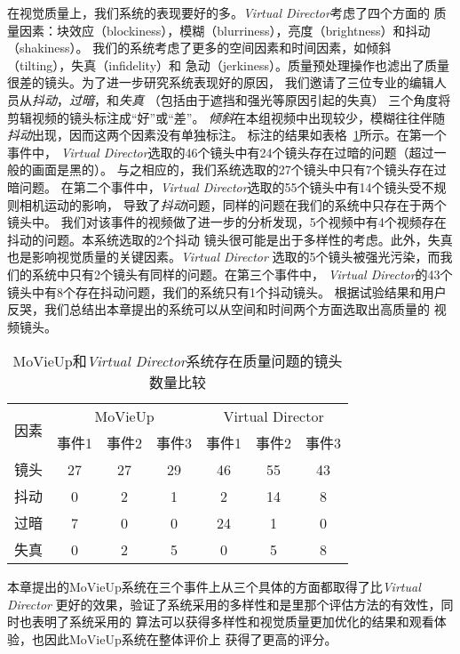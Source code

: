 在视觉质量上，我们系统的表现要好的多。\emph{Virtual Director}考虑了四个方面的
质量因素：块效应（blockiness），模糊（blurriness），亮度（brightness）和抖动（shakiness）。
我们的系统考虑了更多的空间因素和时间因素，如倾斜（tilting），失真（infidelity）和
急动（jerkiness）。质量预处理操作也滤出了质量很差的镜头。为了进一步研究系统表现好的原因，
我们邀请了三位专业的编辑人员从\emph{抖动}，\emph{过暗}，和\emph{失真}
（包括由于遮挡和强光等原因引起的失真） 三个角度将剪辑视频的镜头标注成``好''或``差''。
\emph{倾斜}在本组视频中出现较少，模糊往往伴随\emph{抖动}出现，因而这两个因素没有单独标注。
标注的结果如表格~\ref{tab:mashup-vd-obj-comp}所示。在第一个事件中，
\emph{Virtual Director}选取的46个镜头中有24个镜头存在过暗的问题（超过一般的画面是黑的）。
与之相应的，我们系统选取的27个镜头中只有7个镜头存在过暗问题。
在第二个事件中，\emph{Virtual Director}选取的55个镜头中有14个镜头受不规则相机运动的影响，
导致了\emph{抖动}问题，同样的问题在我们的系统中只存在于两个镜头中。
我们对该事件的视频做了进一步的分析发现，5个视频中有4个视频存在抖动的问题。本系统选取的2个抖动
镜头很可能是出于多样性的考虑。此外，失真也是影响视觉质量的关键因素。\emph{Virtual Director}
选取的5个镜头被强光污染，而我们的系统中只有2个镜头有同样的问题。在第三个事件中，
\emph{Virtual Director}的43个镜头中有8个存在抖动问题，我们的系统只有1个抖动镜头。
根据试验结果和用户反哭，我们总结出本章提出的系统可以从空间和时间两个方面选取出高质量的
视频镜头。
\begin{table}[htbp]
	\centering
    \caption{MoVieUp和\emph{Virtual Director}系统存在质量问题的镜头数量比较}
	\label{tab:mashup-vd-obj-comp}
	\begin{tabular}{|c|c|c|c|c|c|c|}
		\hline
		\multirow{2}{*}{因素} & \multicolumn{3}{c|}{MoVieUp} & \multicolumn{3}{c|}{Virtual Director}  \\ \cline{2-7}
		& 事件1 & 事件2 & 事件3 & 事件1 & 事件2 & 事件3 \\ \hline
		镜头	& 27 & 27 & 29 & 46 & 55& 43 \\ \hline
		抖动	& 0 & 2 & 1 & 2 & 14& 8 \\ \hline
		过暗	& 7 & 0 & 0 & 24 & 1& 0 \\ \hline
		失真	& 0 & 2 & 5 & 0 & 5& 8 \\ \hline
	\end{tabular}
\end{table}

本章提出的MoVieUp系统在三个事件上从三个具体的方面都取得了比\emph{Virtual Director}
更好的效果，验证了系统采用的多样性和是里那个评估方法的有效性，同时也表明了系统采用的
算法可以获得多样性和视觉质量更加优化的结果和观看体验，也因此MoVieUp系统在整体评价上
获得了更高的评分。

